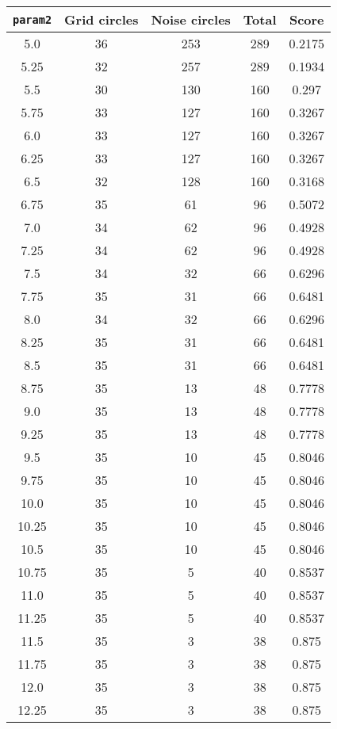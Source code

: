 \documentclass[letterpaper, 12pt]{article}
\begin{document}
\begin{longtable}{|c|c|c|c|c|}
\hline
\textbf{\texttt{param2}} & \textbf{Grid circles} & \textbf{Noise circles} & \textbf{Total} & \textbf{Score} \\
\hline
5.0 & 36 & 253 & 289 & 0.2175 \\
\hline
5.25 & 32 & 257 & 289 & 0.1934 \\
\hline
5.5 & 30 & 130 & 160 & 0.297 \\
\hline
5.75 & 33 & 127 & 160 & 0.3267 \\
\hline
6.0 & 33 & 127 & 160 & 0.3267 \\
\hline
6.25 & 33 & 127 & 160 & 0.3267 \\
\hline
6.5 & 32 & 128 & 160 & 0.3168 \\
\hline
6.75 & 35 & 61 & 96 & 0.5072 \\
\hline
7.0 & 34 & 62 & 96 & 0.4928 \\
\hline
7.25 & 34 & 62 & 96 & 0.4928 \\
\hline
7.5 & 34 & 32 & 66 & 0.6296 \\
\hline
7.75 & 35 & 31 & 66 & 0.6481 \\
\hline
8.0 & 34 & 32 & 66 & 0.6296 \\
\hline
8.25 & 35 & 31 & 66 & 0.6481 \\
\hline
8.5 & 35 & 31 & 66 & 0.6481 \\
\hline
8.75 & 35 & 13 & 48 & 0.7778 \\
\hline
9.0 & 35 & 13 & 48 & 0.7778 \\
\hline
9.25 & 35 & 13 & 48 & 0.7778 \\
\hline
9.5 & 35 & 10 & 45 & 0.8046 \\
\hline
9.75 & 35 & 10 & 45 & 0.8046 \\
\hline
10.0 & 35 & 10 & 45 & 0.8046 \\
\hline
10.25 & 35 & 10 & 45 & 0.8046 \\
\hline
10.5 & 35 & 10 & 45 & 0.8046 \\
\hline
10.75 & 35 & 5 & 40 & 0.8537 \\
\hline
11.0 & 35 & 5 & 40 & 0.8537 \\
\hline
11.25 & 35 & 5 & 40 & 0.8537 \\
\hline
11.5 & 35 & 3 & 38 & 0.875 \\
\hline
11.75 & 35 & 3 & 38 & 0.875 \\
\hline
12.0 & 35 & 3 & 38 & 0.875 \\
\hline
12.25 & 35 & 3 & 38 & 0.875 \\
\hline

\end{longtable}
\end{document}
